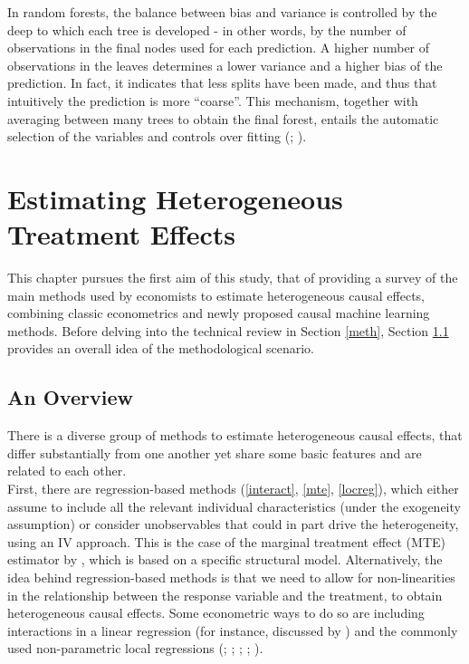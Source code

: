 \documentclass[12pt,a4paper,openright,twoside]{book}
\begin{document}
\begin{doublespacing}
In random forests, the balance between bias and variance is controlled by the deep to which each tree is developed - in other words, by the number of observations in the final nodes used for each prediction. A higher number of observations in the leaves determines a lower variance and a higher bias of the prediction. In fact, it indicates that less splits have been made, and thus that intuitively the prediction is more ``coarse''. This mechanism, together with averaging between many trees to obtain the final forest, entails the automatic selection of the variables and controls over fitting (\citealp{athey2019}; \citealp{goller2020does}). 


\chapter{Estimating Heterogeneous Treatment Effects} 
\label{chap1}{}

This chapter pursues the first aim of this study, that of providing a survey of the main methods used by economists to estimate heterogeneous causal effects, combining classic econometrics and newly proposed causal machine learning methods. Before delving into the technical review in Section \ref{meth}, Section \ref{over} provides an overall idea of the methodological scenario. 


\section{An Overview} \label{over}

There is a diverse group of methods to estimate heterogeneous causal effects, that differ substantially from one another yet share some basic features and are related to each other.\\

First, there are regression-based methods (\ref{interact}, \ref{mte}, \ref{locreg}), which either assume to include all the relevant individual characteristics (under the exogeneity assumption) or consider unobservables that could in part drive the heterogeneity, using an IV approach. This is the case of the marginal treatment effect (MTE) estimator by \citet{heckman2005structural}, which is based on a specific structural model. 
Alternatively, the idea behind regression-based methods is that we need to allow for non-linearities in the relationship between the response variable and the treatment, to obtain heterogeneous causal effects. Some econometric ways to do so are including interactions in a linear regression (for instance, discussed by \citealp{zhouxie2020heterogeneous}) and the commonly used non-parametric local regressions (\citealp{ferwerda2015krls}; \citealp{hastie2009elements}; \citealp{huber2023causal}; \citealp{imbenswooldr2008}; \citealp{shim2009kernel}).


\end{doublespacing}
\end{document}
